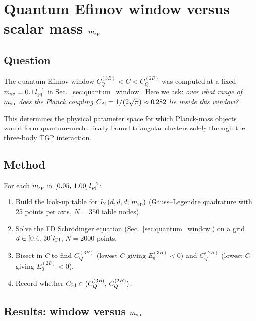 \section{Quantum Efimov window versus scalar mass \texorpdfstring{$m_{\rm sp}$}{m\_sp}}
\label{sec:quantum_window_msp}

\subsection{Question}

The quantum Efimov window $C_Q^{(3B)} < C < C_Q^{(2B)}$ was computed
at a fixed $m_{\rm sp}=0.1\,l_{\rm Pl}^{-1}$ in
Sec.~\ref{sec:quantum_window}.  Here we ask: \emph{over what range of
$m_{\rm sp}$ does the Planck coupling
$C_{\rm Pl}=1/(2\sqrt{\pi})\approx0.282$ lie inside this window?}

This determines the physical parameter space for which Planck-mass
objects would form quantum-mechanically bound triangular clusters
solely through the three-body TGP interaction.

\subsection{Method}

For each $m_{\rm sp}$ in $[0.05,\,1.00]\,l_{\rm Pl}^{-1}$:
\begin{enumerate}
\item Build the look-up table for $I_Y(d,d,d;\,m_{\rm sp})$ (Gauss--Legendre
  quadrature with 25 points per axis, $N=350$ table nodes).
\item Solve the FD Schr\"odinger equation (Sec.~\ref{sec:quantum_window})
  on a grid $d\in[0.4,\,30\,]l_{\rm Pl}$, $N=2000$ points.
\item Bisect in $C$ to find $C_Q^{(3B)}$ (lowest $C$ giving $E_0^{(3B)}<0$)
  and $C_Q^{(2B)}$ (lowest $C$ giving $E_0^{(2B)}<0$).
\item Record whether $C_{\rm Pl}\in(C_Q^{(3B)},\,C_Q^{(2B)})$.
\end{enumerate}

\subsection{Results: window versus \texorpdfstring{$m_{\rm sp}$}{m\_sp}}

